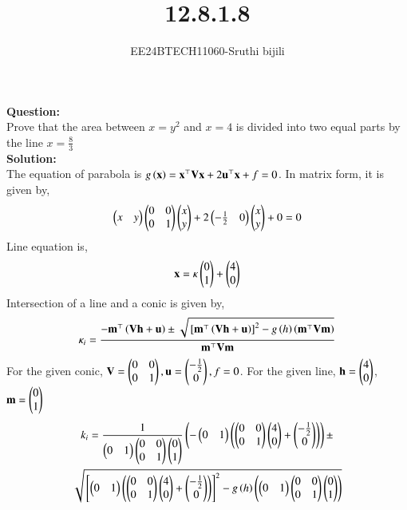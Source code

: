 \documentclass[journal]{IEEEtran}
\begin{document}

\vspace{3cm}

\title{12.8.1.8}
\author{EE24BTECH11060-Sruthi bijili}
{\let\newpage\relax\maketitle}
\textbf{Question:}\\
Prove that the area between $x = y^2$ and $x = 4$ is divided into two equal parts by the line $x = \frac{8}{3}$\\
\textbf{Solution:}\\
The equation of parabola is $g \left(\mathbf{x}\right) = \mathbf{x}^{\top}\mathbf{V}\mathbf{x} + 2 \mathbf{u}^{\top}\mathbf{x} + f = 0$. In matrix form, it is given by,
\begin{align}
	\begin{pmatrix}x & y\end{pmatrix} \begin{pmatrix}0 & 0 \\ 0 & 1\end{pmatrix} \begin{pmatrix}x \\ y\end{pmatrix} + 2 \begin{pmatrix}-\frac{1}{2} & 0\end{pmatrix} \begin{pmatrix}x \\ y\end{pmatrix} + 0 = 0
\end{align}
Line equation is,
\begin{align}
	\mathbf{x} = \kappa \begin{pmatrix}0\\1\end{pmatrix} + \begin{pmatrix}4\\0\end{pmatrix}
\end{align}
Intersection of a line and a conic is given by,
\begin{align}
	\kappa_i = \frac{-\mathbf{m}^{\top}\left(\mathbf{Vh}+\mathbf{u}\right)\pm\sqrt{{}\left[\mathbf{m}^{\top}\left(\mathbf{Vh}+\mathbf{u}\right)\right]^2-g\left(h\right)\left(\mathbf{m}^{\top}\mathbf{Vm}\right)}}{\mathbf{m}^{\top}\mathbf{Vm}}
\end{align}
For the given conic, $\mathbf{V}=\begin{pmatrix}0 & 0 \\ 0 & 1 \end{pmatrix}, \mathbf{u} = \begin{pmatrix}-\frac{1}{2}\\ 0\end{pmatrix}, f = 0$. For the given line, $\mathbf{h}=\begin{pmatrix}4 \\ 0\end{pmatrix}$, $\mathbf{m}=\begin{pmatrix}0 \\ 1\end{pmatrix}$
\begin{multline}
     k_i =\frac{1}{\begin{pmatrix}0 
 & 1\end{pmatrix}\begin{pmatrix}0 &0  \\ 0 & 1\end{pmatrix}\begin{pmatrix}0 \\ 1\end{pmatrix}}\left(-\begin{pmatrix}0&1\end{pmatrix}\left(\begin{pmatrix}0&0\\0&1\end{pmatrix}\begin{pmatrix}4\\0\end{pmatrix}+\begin{pmatrix}-\frac{1}{2}\\0\end{pmatrix}\right)\right)\pm \\
     \sqrt{{}\left[\begin{pmatrix}0&1\end{pmatrix}\left(\begin{pmatrix}0&0\\0&1\end{pmatrix}\begin{pmatrix}4\\0\end{pmatrix}+\begin{pmatrix}-\frac{1}{2}\\0\end{pmatrix}\right)\right]^2-g\left(h\right)\left(\begin{pmatrix}0&1\end{pmatrix}\begin{pmatrix}0&0\\0&1\end{pmatrix}\begin{pmatrix}0\\1\end{pmatrix}\right)} 
\end{multline}
\end{document}
